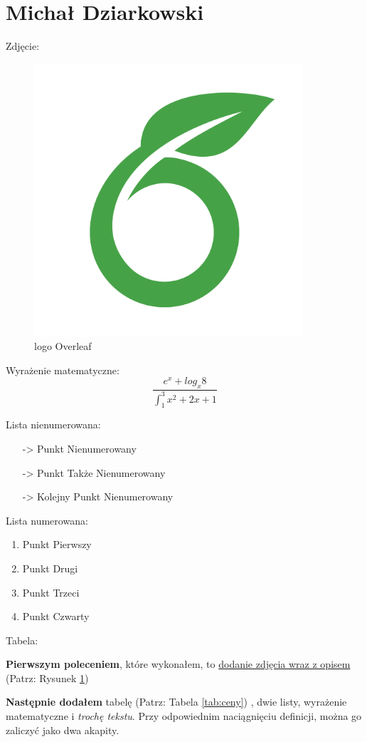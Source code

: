 \section{Michał Dziarkowski}

Zdjęcie:
\begin{figure}[h]
  \includegraphics[width=10cm]{pictures/logo}
  \centering
  \caption{logo Overleaf}
  \label{fig:logo}
\end{figure}

Wyrażenie matematyczne:
\[
\frac{e^x+log_x 8}{\int_1^3 {x^2+2x+1}}
\]



Lista nienumerowana:
\begin{itemize}
  \item[->] Punkt Nienumerowany
  \item[->] Punkt Także Nienumerowany
  \item[->] Kolejny Punkt Nienumerowany
\end{itemize}

Lista numerowana:
\begin{enumerate}
    \item Punkt Pierwszy
    \item Punkt Drugi
    \item Punkt Trzeci
    \item Punkt Czwarty
\end{enumerate}

Tabela:\newline


\textbf{Pierwszym poleceniem}, które wykonałem, to \underline{dodanie zdjęcia wraz z opisem} (Patrz: Rysunek \ref{fig:logo})

\textbf{Następnie dodałem} tabelę (Patrz: Tabela \ref{tab:ceny}) , dwie listy, wyrażenie matematyczne i \textit{trochę tekstu}. Przy odpowiednim naciągnięciu definicji, można go zaliczyć jako dwa akapity.
